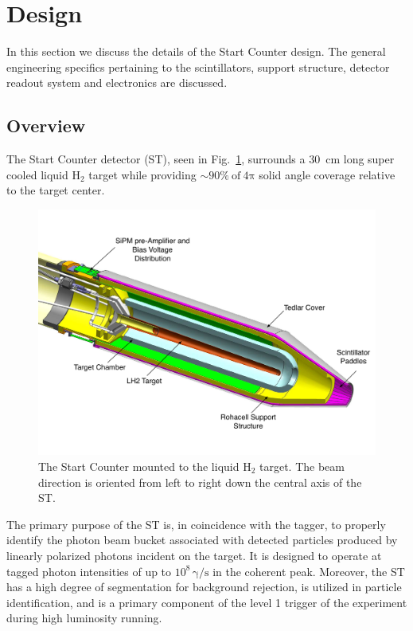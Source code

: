 \section{Design} \label{sec:design}

In this section we discuss the details of the \gx{} Start Counter design.  The general engineering specifics pertaining to the scintillators, support structure, detector readout system and electronics are discussed.

\subsection{Overview} \label{sec:design_overview}
The Start Counter detector (ST), seen in Fig.~\ref{fig:sttargetiso}, surrounds a 30~cm long super cooled liquid $\mathrm{H_{2}}$ target while providing $\sim 90 \%\ \mathrm{of\ 4 \pi}$ solid angle coverage relative to the target center.
	\begin{figure}[!htb]
		\centering
		\includegraphics[width=1.0\columnwidth]{design/figs/start_counter_all.pdf}
		\caption{The \gx{} Start Counter mounted to the liquid $\mathrm{H_2}$ target.  The beam direction is oriented from left to right down the central axis of the ST.}
		\label{fig:sttargetiso}
	\end{figure}
The primary purpose of the ST is, in coincidence with the tagger, to properly identify the photon beam bucket associated with detected particles produced by linearly polarized photons incident on the target. It is designed to operate at tagged photon intensities of up to $10^{8}\,\mathrm{\gamma/s}$ in the coherent peak.  Moreover, the ST has a high degree of segmentation for background rejection, is utilized in particle identification, and is a primary component of the level 1 trigger of the \gx{} experiment during high luminosity running\cite{pooser16}.

